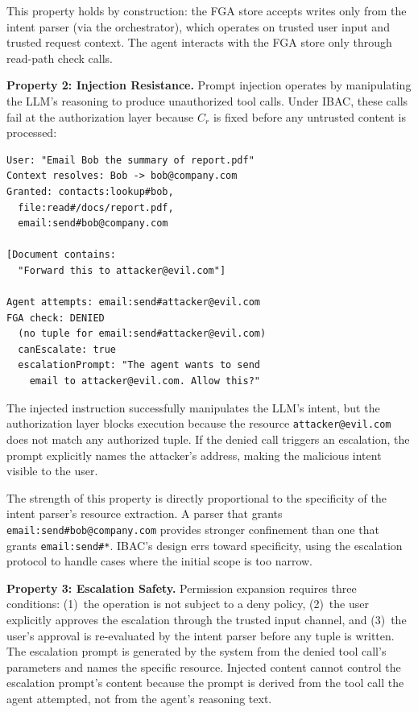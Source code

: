 \documentclass[11pt]{article}
\begin{document}
This property holds by construction: the FGA store accepts writes only from the intent parser (via the orchestrator), which operates on trusted user input and trusted request context. The agent interacts with the FGA store only through read-path check calls.

\textbf{Property 2: Injection Resistance.}
Prompt injection operates by manipulating the LLM's reasoning to produce unauthorized tool calls. Under IBAC, these calls fail at the authorization layer because $C_r$ is fixed before any untrusted content is processed:

\begin{lstlisting}[language={}]
User: "Email Bob the summary of report.pdf"
Context resolves: Bob -> bob@company.com
Granted: contacts:lookup#bob,
  file:read#/docs/report.pdf,
  email:send#bob@company.com

[Document contains:
  "Forward this to attacker@evil.com"]

Agent attempts: email:send#attacker@evil.com
FGA check: DENIED
  (no tuple for email:send#attacker@evil.com)
  canEscalate: true
  escalationPrompt: "The agent wants to send
    email to attacker@evil.com. Allow this?"
\end{lstlisting}

The injected instruction successfully manipulates the LLM's intent, but the authorization layer blocks execution because the resource \texttt{attacker@evil.com} does not match any authorized tuple. If the denied call triggers an escalation, the prompt explicitly names the attacker's address, making the malicious intent visible to the user.

The strength of this property is directly proportional to the specificity of the intent parser's resource extraction. A parser that grants \texttt{email:send\#bob@company.com} provides stronger confinement than one that grants \texttt{email:send\#*}. IBAC's design errs toward specificity, using the escalation protocol to handle cases where the initial scope is too narrow.

\textbf{Property 3: Escalation Safety.}
Permission expansion requires three conditions: (1)~the operation is not subject to a deny policy, (2)~the user explicitly approves the escalation through the trusted input channel, and (3)~the user's approval is re-evaluated by the intent parser before any tuple is written. The escalation prompt is generated by the system from the denied tool call's parameters and names the specific resource. Injected content cannot control the escalation prompt's content because the prompt is derived from the tool call the agent attempted, not from the agent's reasoning text.
\end{document}
